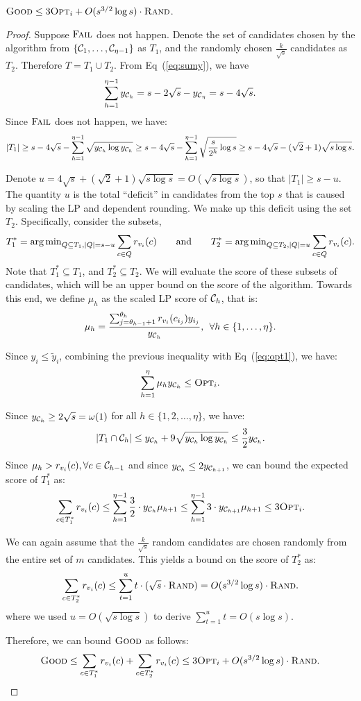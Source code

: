 \begin{lemma}
\label{lem:good}
${\normalfont\textsc{Good}} \leq 3{\normalfont\textsc{Opt}}_i +O(s^{3/2}\log s)\cdot {\normalfont\textsc{Rand}}$.
\end{lemma}
\begin{proof}
Suppose ${\normalfont\textsc{Fail}}$ does not happen. Denote the set of candidates chosen by the algorithm from $\{\mathcal{C}_1, \ldots, \mathcal{C}_{\eta-1}\}$ as $T_1$, and the randomly chosen $\frac{k}{\sqrt{s}}$ candidates as $T_2$. Therefore $T = T_1 \cup T_2$. From Eq~(\ref{eq:sumy}), we have 
$$\sum_{h=1}^{\eta-1} y_{\mathcal{C}_h} = s - 2\sqrt{s} - y_{\mathcal{C}_{\eta}} = s - 4\sqrt{s}.$$ 
Since ${\normalfont\textsc{Fail}}$ does not happen, we have:
$$|T_1| \geq s - 4 \sqrt{s} - \sum_{h = 1}^{\eta-1} \sqrt{y_{\mathcal{C}_h}\log y_{\mathcal{C}_h}} \geq s - 4 \sqrt{s} - \sum_{h = 1}^{\eta-1} \sqrt{\frac{s}{2^h}\log s} \geq s - 4 \sqrt{s} - (\sqrt{2} + 1)\sqrt{s\log s}.$$

Denote $u = 4 \sqrt{s} + (\sqrt{2} + 1)\sqrt{s\log s} = O(\sqrt{s\log s})$, so that $|T_1| \ge s - u$.  The quantity $u$ is the total ``deficit'' in candidates from the top $s$ that is caused by scaling the LP and dependent rounding. We make up this deficit using the set $T_2$. Specifically, consider the subsets, 
$$T_1^* = \operatorname{arg\,min}_{Q \subseteq T_1, |Q| = s - u}\sum_{c \in Q}r_{v_i}(c) \qquad \mbox{and} \qquad T_2^* = \operatorname{arg\,min}_{Q \subseteq T_2, |Q| = u}\sum_{c \in Q}r_{v_i}(c).$$ 
Note that $T_1^* \subseteq T_1$, and $T_2^* \subseteq T_2$. We will evaluate the score of these subsets of candidates, which will be an upper bound on the score of the algorithm. Towards this end, we define $\mu_h$ as the scaled LP score of $\mathcal{C}_{h}$, that is:
$$\mu_h = \frac{\sum_{j = \theta_{h - 1} + 1}^{\theta_h}r_{v_i}(c_{i_j})y_{i_j}}{y_{\mathcal{C}_h}}, \:\: \forall h \in \{1, \ldots, \eta\}.$$

Since $y_i \le \tilde{y}_i$, combining the previous inequality with Eq~(\ref{eq:opt1}), we have:
$$\sum_{h = 1}^{\eta}\mu_hy_{\mathcal{C}_h} \le {\normalfont\textsc{Opt}}_i.$$

Since $y_{\mathcal{C}_h} \ge 2\sqrt{s} = \omega(1)$ for all $h \in \{1,2,\ldots, \eta\}$, we have:
$$|T_1 \cap \mathcal{C}_h| \le y_{\mathcal{C}_h} + 9 \sqrt{y_{\mathcal{C}_h} \log y_{\mathcal{C}_h}} \le \frac{3}{2} y_{\mathcal{C}_h}.$$ 

Since $\mu_h > r_{v_i}(c), \forall c \in \mathcal{C}_{h - 1}$ and since $y_{\mathcal{C}_h} \le 2 y_{\mathcal{C}_{h+1}}$, we can bound the expected score of $T_1^*$ as:
$$\sum_{c \in T_1^*}r_{v_i}(c) \leq \sum_{h = 1}^{\eta-1} \frac{3}{2} \cdot y_{\mathcal{C}_h}\mu_{h + 1} \le \sum_{h = 1}^{\eta-1} 3\cdot y_{\mathcal{C}_{h + 1}}\mu_{h + 1} \le 3{\normalfont\textsc{Opt}}_i.$$

We can again assume that the $\frac{k}{\sqrt{s}}$ random candidates are chosen randomly from the entire set of $m$ candidates. This yields a bound on the score of $T_2^*$ as:
$$\sum_{c \in T_2^*}r_{v_i}(c) \leq \sum_{t = 1}^u t \cdot(\sqrt{s}\cdot {\normalfont\textsc{Rand}}) = O(s^{3/2}\log s)\cdot {\normalfont\textsc{Rand}}.$$
where we used $u = O(\sqrt{s\log s})$ to derive $\sum_{t = 1}^u t = O(s\log s)$. 

Therefore, we can bound ${\normalfont\textsc{Good}}$ as follows:
\[{\normalfont\textsc{Good}} \leq \sum_{c \in T_1^*}r_{v_i}(c) + \sum_{c \in T_2^*}r_{v_i}(c) \leq 3{\normalfont\textsc{Opt}}_i + O(s^{3/2}\log s)\cdot {\normalfont\textsc{Rand}}.\qedhere\]
\end{proof}

